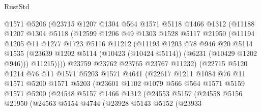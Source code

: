 \begin{lexlean}{RustStd}
\begin{coremodule}
{{                  @1571
                  @5206
                  (@23715
                    @1207
                    @1304
                    @564
                    @1571
                    @5118
                    @1466
                    @1312
                    (@11188
                      @1207
                      @1304
                      @5118
                      (@12599
                        @1206
                        @49
                        @1303
                        @1528
                        @5117
                        @21950
                        (@11194
                          @1205
                          @11
                          @1277
                          @1723
                          @5116
                          @11212
                          (@11193
                            @1203
                            @78
                            @946
                            @20
                            @5114
                            @1535
                            (@23639 @1202 @5114 (@10423 (@10424 @5114)) (@6231 (@10429 @1202 @946)))
                            @11215))))
                    @23759
                    @23762
                    @23765
                    @23767
                    @11232)
                  (@22715
                    @5120
                    @1214
                    @76
                    @11
                    @1571
                    @5203
                    @1571
                    @4641
                    (@22617
                      @1211
                      @1084
                      @76
                      @11
                      @1571
                      @5200
                      @1571
                      @5203
                      (@23601
                        @1102
                        @1079
                        @566
                        @564
                        @1571
                        @5159
                        @1571
                        @5200
                        (@24548
                          @5157
                          @1466
                          @1312
                          (@24553
                            @5157
                            (@24558
                              @5156
                              @21950
                              (@24563
                                @5154
                                @4744
                                (@23928
                                  @5143
                                  @5152
                                  (@23933
}}
\end{coremodule}
\end{lexlean}
